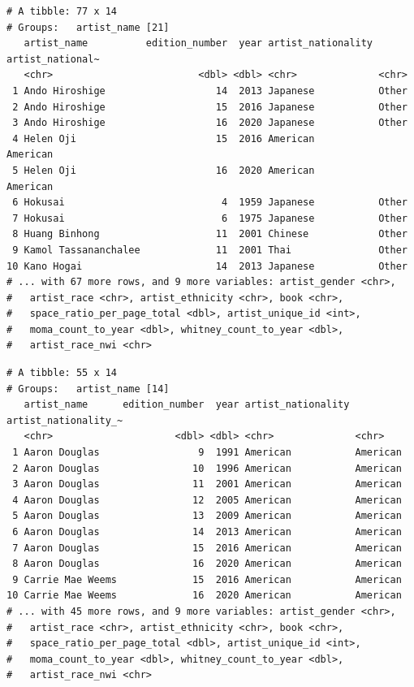 \documentclass[
  letterpaper,
  DIV=11,
  numbers=noendperiod]{scrreprt}
\begin{document}
\begin{verbatim}
# A tibble: 77 x 14
# Groups:   artist_name [21]
   artist_name          edition_number  year artist_nationality artist_national~
   <chr>                         <dbl> <dbl> <chr>              <chr>           
 1 Ando Hiroshige                   14  2013 Japanese           Other           
 2 Ando Hiroshige                   15  2016 Japanese           Other           
 3 Ando Hiroshige                   16  2020 Japanese           Other           
 4 Helen Oji                        15  2016 American           American        
 5 Helen Oji                        16  2020 American           American        
 6 Hokusai                           4  1959 Japanese           Other           
 7 Hokusai                           6  1975 Japanese           Other           
 8 Huang Binhong                    11  2001 Chinese            Other           
 9 Kamol Tassananchalee             11  2001 Thai               Other           
10 Kano Hogai                       14  2013 Japanese           Other           
# ... with 67 more rows, and 9 more variables: artist_gender <chr>,
#   artist_race <chr>, artist_ethnicity <chr>, book <chr>,
#   space_ratio_per_page_total <dbl>, artist_unique_id <int>,
#   moma_count_to_year <dbl>, whitney_count_to_year <dbl>,
#   artist_race_nwi <chr>
\end{verbatim}

\begin{verbatim}
# A tibble: 55 x 14
# Groups:   artist_name [14]
   artist_name      edition_number  year artist_nationality artist_nationality_~
   <chr>                     <dbl> <dbl> <chr>              <chr>               
 1 Aaron Douglas                 9  1991 American           American            
 2 Aaron Douglas                10  1996 American           American            
 3 Aaron Douglas                11  2001 American           American            
 4 Aaron Douglas                12  2005 American           American            
 5 Aaron Douglas                13  2009 American           American            
 6 Aaron Douglas                14  2013 American           American            
 7 Aaron Douglas                15  2016 American           American            
 8 Aaron Douglas                16  2020 American           American            
 9 Carrie Mae Weems             15  2016 American           American            
10 Carrie Mae Weems             16  2020 American           American            
# ... with 45 more rows, and 9 more variables: artist_gender <chr>,
#   artist_race <chr>, artist_ethnicity <chr>, book <chr>,
#   space_ratio_per_page_total <dbl>, artist_unique_id <int>,
#   moma_count_to_year <dbl>, whitney_count_to_year <dbl>,
#   artist_race_nwi <chr>
\end{verbatim}
\end{document}
